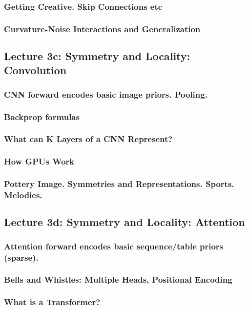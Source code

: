 \documentclass[12pt]{article}
\begin{document}
      \subsubsection*{Getting Creative.  Skip Connections etc}
      \subsubsection*{Curvature-Noise Interactions and Generalization}
    \newpage

    \subsection*{Lecture 3c: Symmetry and Locality: Convolution}
      \subsubsection*{CNN forward encodes basic image priors.  Pooling.}
      \subsubsection*{Backprop formulas}
      \subsubsection*{What can K Layers of a CNN Represent?}
      \subsubsection*{How GPUs Work}
      \subsubsection*{Pottery Image.  Symmetries and Representations.  Sports.  Melodies.}
    \newpage

    \subsection*{Lecture 3d: Symmetry and Locality: Attention}
      \subsubsection*{Attention forward encodes basic sequence/table priors (sparse).}
      \subsubsection*{Bells and Whistles: Multiple Heads, Positional Encoding}
      \subsubsection*{What is a Transformer?}
\end{document}
